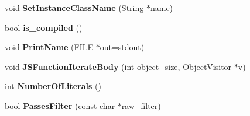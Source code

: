 \begin{DoxyCompactItemize}
\item 
\hypertarget{classv8_1_1internal_1_1_j_s_function_a8548c9af8b67a6099e312ee6eb83896e}{}void {\bfseries Set\+Instance\+Class\+Name} (\hyperlink{classv8_1_1internal_1_1_string}{String} $\ast$name)\label{classv8_1_1internal_1_1_j_s_function_a8548c9af8b67a6099e312ee6eb83896e}

\item 
\hypertarget{classv8_1_1internal_1_1_j_s_function_a3114e243eaac45ad3bfa6a8b1edc61d3}{}bool {\bfseries is\+\_\+compiled} ()\label{classv8_1_1internal_1_1_j_s_function_a3114e243eaac45ad3bfa6a8b1edc61d3}

\item 
\hypertarget{classv8_1_1internal_1_1_j_s_function_afdf047a8a215131dc1002a7af9504a66}{}void {\bfseries Print\+Name} (F\+I\+L\+E $\ast$out=stdout)\label{classv8_1_1internal_1_1_j_s_function_afdf047a8a215131dc1002a7af9504a66}

\item 
\hypertarget{classv8_1_1internal_1_1_j_s_function_a1d88edf36ef4741264f9a4183606f129}{}void {\bfseries J\+S\+Function\+Iterate\+Body} (int object\+\_\+size, Object\+Visitor $\ast$v)\label{classv8_1_1internal_1_1_j_s_function_a1d88edf36ef4741264f9a4183606f129}

\item 
\hypertarget{classv8_1_1internal_1_1_j_s_function_a37aaee971e25f4bbd4a84675eea72cea}{}int {\bfseries Number\+Of\+Literals} ()\label{classv8_1_1internal_1_1_j_s_function_a37aaee971e25f4bbd4a84675eea72cea}

\item 
\hypertarget{classv8_1_1internal_1_1_j_s_function_ab49dc4f6b609ea3c5495ba8406c8698b}{}bool {\bfseries Passes\+Filter} (const char $\ast$raw\+\_\+filter)\label{classv8_1_1internal_1_1_j_s_function_ab49dc4f6b609ea3c5495ba8406c8698b}

\end{DoxyCompactItemize}
